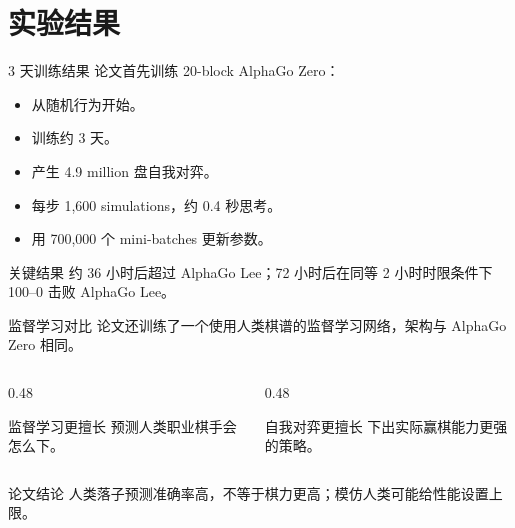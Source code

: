 \documentclass[UTF8,aspectratio=169,10pt]{ctexbeamer}
\begin{document}
\section{实验结果}

\begin{frame}{3 天训练结果}
  \small
  论文首先训练 20-block AlphaGo Zero：

  \begin{itemize}
    \item 从随机行为开始。
    \item 训练约 3 天。
    \item 产生 4.9 million 盘自我对弈。
    \item 每步 1,600 simulations，约 0.4 秒思考。
    \item 用 700,000 个 mini-batches 更新参数。
  \end{itemize}

  \begin{alertblock}{关键结果}
    约 36 小时后超过 AlphaGo Lee；72 小时后在同等 2 小时时限条件下 100--0 击败 AlphaGo Lee。
  \end{alertblock}
\end{frame}

\begin{frame}{监督学习对比}
  论文还训练了一个使用人类棋谱的监督学习网络，架构与 AlphaGo Zero 相同。

  \begin{columns}[T,onlytextwidth]
    \begin{column}{0.48\textwidth}
      \begin{block}{监督学习更擅长}
        预测人类职业棋手会怎么下。
      \end{block}
    \end{column}
    \begin{column}{0.48\textwidth}
      \begin{block}{自我对弈更擅长}
        下出实际赢棋能力更强的策略。
      \end{block}
    \end{column}
  \end{columns}

  \begin{alertblock}{论文结论}
    人类落子预测准确率高，不等于棋力更高；模仿人类可能给性能设置上限。
  \end{alertblock}
\end{frame}
\end{document}

